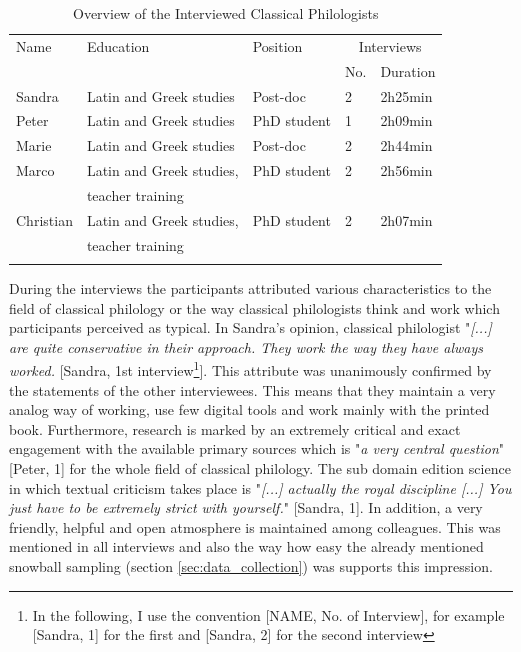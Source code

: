 \documentclass[12pt, a4paper, titlepage, oneside, abstract=true, toc=listof, toc=bibliography, BCOR=1cm]{scrreprt}
\begin{document}
\small
\begin{table}
\caption{Overview of the Interviewed Classical Philologists}
\label{tab:interviewees}
\centering
\begin{tabular}{lllll}
& & & &\\
\hline
Name & Education & Position & \multicolumn{2}{c}{Interviews}\\
 & &  & No. & Duration\\
\hline
\hline
Sandra & Latin and Greek studies & Post-doc & 2 & 2h25min\\
Peter & Latin and Greek studies & PhD student & 1 & 2h09min\\
Marie & Latin and Greek studies & Post-doc & 2 & 2h44min\\
Marco & Latin and Greek studies, & PhD student & 2 & 2h56min\\
      & teacher training & & & \\
Christian & Latin and Greek studies, & PhD student & 2 & 2h07min\\
      & teacher training & & & \\
\hline
& & & &\\
\end{tabular}
\end{table}
\normalsize

During the interviews the participants attributed various characteristics to the field of classical philology or the way classical philologists think and work which participants perceived as typical. %
In Sandra's opinion, classical philologist "\textit{[...] are quite conservative in their approach. They work the way they have always worked.} [Sandra, 1st interview\footnote{In the following, I use the convention [NAME, No. of Interview], for example [Sandra, 1] for the first and [Sandra, 2] for the second interview}]. This attribute was unanimously confirmed by the statements of the other interviewees. This means that they maintain a very analog way of working, use few digital tools and work mainly with the printed book. %
Furthermore, research is marked by an extremely critical and exact engagement with the available primary sources which is "\textit{a very central question}" [Peter, 1] for the whole field of classical philology. The sub domain edition science in which textual criticism takes place is "\textit{[...] actually the royal discipline [...] You just have to be extremely strict with yourself.}" [Sandra, 1]. In addition, a very friendly, helpful and open atmosphere is maintained among colleagues. This was mentioned in all interviews and also the way how easy the already mentioned snowball sampling (section \ref{sec:data_collection}) was supports this impression.
\end{document}
